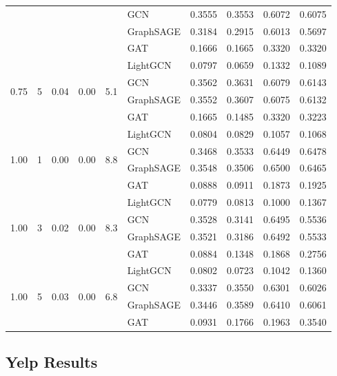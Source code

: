 {\begin{longtable}{cccccl rrrr}
 & & & & & GCN & 0.3555 & 0.3553 & 0.6072 & 0.6075 \\
 & & & & & GraphSAGE & 0.3184 & 0.2915 & 0.6013 & 0.5697 \\
 & & & & & GAT & 0.1666 & 0.1665 & 0.3320 & 0.3320 \\
\midrule
\multirow{4}{*}{0.75} & \multirow{4}{*}{5} & \multirow{4}{*}{0.04} & \multirow{4}{*}{0.00} & \multirow{4}{*}{5.1} & LightGCN & 0.0797 & 0.0659 & 0.1332 & 0.1089 \\
 & & & & & GCN & 0.3562 & 0.3631 & 0.6079 & 0.6143 \\
 & & & & & GraphSAGE & 0.3552 & 0.3607 & 0.6075 & 0.6132 \\
 & & & & & GAT & 0.1665 & 0.1485 & 0.3320 & 0.3223 \\
\midrule
\multirow{4}{*}{1.00} & \multirow{4}{*}{1} & \multirow{4}{*}{0.00} & \multirow{4}{*}{0.00} & \multirow{4}{*}{8.8} & LightGCN & 0.0804 & 0.0829 & 0.1057 & 0.1068 \\
 & & & & & GCN & 0.3468 & 0.3533 & 0.6449 & 0.6478 \\
 & & & & & GraphSAGE & 0.3548 & 0.3506 & 0.6500 & 0.6465 \\
 & & & & & GAT & 0.0888 & 0.0911 & 0.1873 & 0.1925 \\
\midrule
\multirow{4}{*}{1.00} & \multirow{4}{*}{3} & \multirow{4}{*}{0.02} & \multirow{4}{*}{0.00} & \multirow{4}{*}{8.3} & LightGCN & 0.0779 & 0.0813 & 0.1000 & 0.1367 \\
 & & & & & GCN & 0.3528 & 0.3141 & 0.6495 & 0.5536 \\
 & & & & & GraphSAGE & 0.3521 & 0.3186 & 0.6492 & 0.5533 \\
 & & & & & GAT & 0.0884 & 0.1348 & 0.1868 & 0.2756 \\
\midrule
\multirow{4}{*}{1.00} & \multirow{4}{*}{5} & \multirow{4}{*}{0.03} & \multirow{4}{*}{0.00} & \multirow{4}{*}{6.8} & LightGCN & 0.0802 & 0.0723 & 0.1042 & 0.1360 \\
 & & & & & GCN & 0.3337 & 0.3550 & 0.6301 & 0.6026 \\
 & & & & & GraphSAGE & 0.3446 & 0.3589 & 0.6410 & 0.6061 \\
 & & & & & GAT & 0.0931 & 0.1766 & 0.1963 & 0.3540 \\
\midrule
\end{longtable}
}

\subsection*{Yelp Results}
